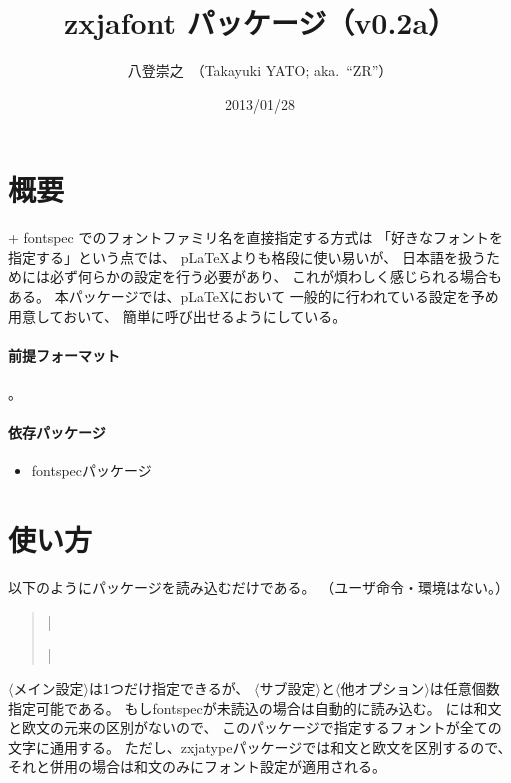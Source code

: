 \documentclass[a4paper]{bxjsarticle}
\newcommand{\PkgVersion}{0.2a}
\newcommand{\Pkg}[1]{\textsf{#1}}
\newcommand{\Meta}[1]{$\langle$\mbox{}#1\mbox{}$\rangle$}
\providecommand{\pLaTeX}{p\LaTeX}
\begin{document}
\title{\Pkg{zxjafont} パッケージ（v\PkgVersion）}
\author{八登崇之\ （Takayuki YATO; aka.~``ZR''）}
\date{2013/01/28}
\maketitle

\section{概要}

{\XeLaTeX} + fontspec でのフォントファミリ名を直接指定する方式は
「好きなフォントを指定する」という点では、
{\pLaTeX}\>よりも格段に使い易いが、
日本語を扱うためには必ず何らかの設定を行う必要があり、
これが煩わしく感じられる場合もある。
本パッケージでは、{\pLaTeX}\>において
一般的に行われている設定を予め用意しておいて、
簡単に呼び出せるようにしている。

\paragraph{前提フォーマット}
{\XeLaTeX}。

\paragraph{依存パッケージ}
\begin{itemize}
\item \Pkg{fontspec}パッケージ
\end{itemize}

\section{使い方}

以下のようにパッケージを読み込むだけである。
（ユーザ命令・環境はない。）
\begin{quote}\small
|\usepackage[|\Meta{メイン設定}|,|\Meta{サブ設定}|,|%
\Meta{他オプション}|]{zxjafont}|
\end{quote}

\Meta{メイン設定}は1つだけ指定できるが、
\Meta{サブ設定}と\Meta{他オプション}は任意個数指定可能である。
もし\Pkg{fontspec}が未読込の場合は自動的に読み込む。
{\XeLaTeX}\>には和文と欧文の元来の区別がないので、
このパッケージで指定するフォントが全ての文字に通用する。
ただし、\Pkg{zxjatype}パッケージでは和文と欧文を区別するので、
それと併用の場合は和文のみにフォント設定が適用される。
\end{document}
